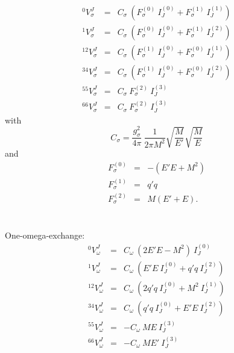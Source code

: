 \begin{eqnarray}
^0V^J_{\sigma} & = &
C_{\sigma}\: ( F^{(0)}_{\sigma}\: I^{(0)}_J + F^{(1)}_{\sigma}\: I^{(1)}_J )
\nonumber \\
^1V^J_{\sigma} & = &
C_{\sigma}\: ( F^{(0)}_{\sigma}\: I^{(0)}_J + F^{(1)}_{\sigma}\: I^{(2)}_J )
\nonumber \\
^{12}V^J_{\sigma} & = &
C_{\sigma}\: ( F^{(1)}_{\sigma}\: I^{(0)}_J + F^{(0)}_{\sigma}\: I^{(1)}_J )
\label{32.9} \\
^{34}V^J_{\sigma} & = &
C_{\sigma}\: ( F^{(1)}_{\sigma}\: I^{(0)}_J + F^{(0)}_{\sigma}\: I^{(2)}_J )
\nonumber \\
^{55}V^J_{\sigma} & = &
C_{\sigma}\:  F^{(2)}_{\sigma}\: I^{(3)}_J
\nonumber \\
^{66}V^J_{\sigma} & = &
C_{\sigma}\:  F^{(2)}_{\sigma}\: I^{(3)}_J
\nonumber
\end{eqnarray}
with
\begin{equation}
C_{\sigma}= \frac{g^2_{\sigma}}{4\pi}\: \frac{1}{2\pi M^2}
\sqrt{\frac{M}{E'}}
\sqrt{\frac{M}{E}}
\label{32.10}
\end{equation}
and
\begin{eqnarray}
F^{(0)}_{\sigma} & = & - (E'E+M^2) \nonumber \\
F^{(1)}_{\sigma} & = & q'q \label{32.11} \\
F^{(2)}_{\sigma} & = & M(E'+E) .  \nonumber
\end{eqnarray}
\\ \\
One-omega-exchange:
\begin{eqnarray}
^0V^J_{\omega} & = &
C_{\omega}\: (2E'E-M^2)\: I^{(0)}_J 
\nonumber \\
^1V^J_{\omega} & = &
C_{\omega}\: ( E'E\: I^{(0)}_J + q'q\: I^{(2)}_J )
\nonumber \\
^{12}V^J_{\omega} & = &
C_{\omega}\: ( 2q'q\: I^{(0)}_J + M^2\: I^{(1)}_J )
\label{32.12} \\
^{34}V^J_{\omega} & = &
C_{\omega}\: ( q'q\: I^{(0)}_J + E'E\: I^{(2)}_J )
\nonumber \\
^{55}V^J_{\omega} & = &
-C_{\omega}\:  ME\: I^{(3)}_J
\nonumber \\
^{66}V^J_{\omega} & = &
-C_{\omega}\:  ME'\: I^{(3)}_J
\nonumber
\end{eqnarray}
